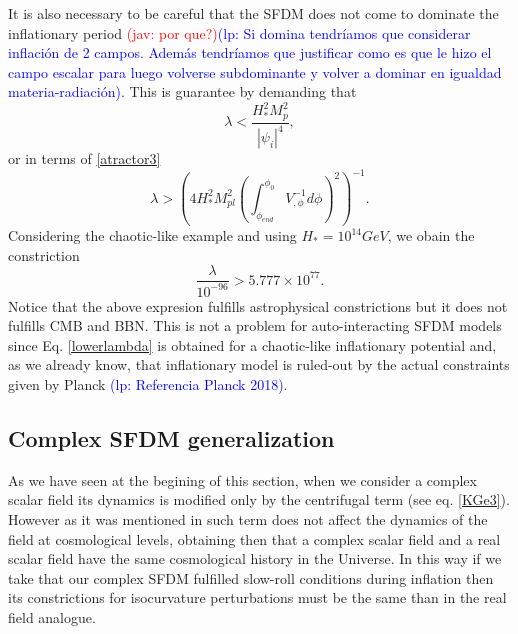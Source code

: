 \documentclass[amssymb,twocolumn,prd,nofootinbib,showpacs]{revtex4-1}
\newcommand{\jav}[1]{\textcolor{red}{(jav: #1)}}
\newcommand{\lp}[1]{\textcolor{blue}{(lp: #1)}}
\begin{document}
It is also necessary to be careful that the SFDM does not come to dominate the inflationary period \jav{por que?}\lp{Si domina tendr\'iamos que considerar inflaci\'on
de 2 campos.  Adem\'as tendr\'iamos que justificar como es
que le hizo el campo escalar para luego volverse subdominante y volver a dominar en igualdad materia-radiaci\'on}.  
This is guarantee by demanding that
%
\begin{equation}
\lambda < \frac{H_*^2 M_p^2}{|\psi_i|^4},
\end{equation}
%
or in terms of \eqref{atractor3}
%
\begin{equation}
\lambda>\left(4H_*^2M_{pl}^2\left(\int_{\phi_{end}}^{\phi_0}V_{,\phi}^{-1}d\phi\right)^2\right)^{-1}.
\end{equation}
%
Considering the chaotic-like example and using $H_*= 10^{14} GeV$, we obain the constriction
\begin{equation}\label{lowerlambda}
\frac{\lambda}{10^{-96}} > 5.777\times 10^{77}.
\end{equation}
Notice that the above expresion fulfills astrophysical constrictions but it does not fulfills CMB and BBN. This is not a problem for auto-interacting SFDM models since Eq. \eqref{lowerlambda} is obtained for a 
chaotic-like inflationary potential and, as we already know, that inflationary model is ruled-out by 
the actual constraints given by Planck \lp{Referencia Planck 2018}.



\subsection{Complex SFDM generalization}
As we have seen at the begining of this section, when we consider a complex scalar field its dynamics is modified 
only by the centrifugal term (see eq. \eqref{KGe3}). However as it was mentioned in \cite{SFphi42} 
such term does not affect the dynamics of the field at cosmological levels, obtaining then that a 
complex scalar field and a real scalar field have the same cosmological history in the Universe. 
%
In this way if we take that our complex SFDM fulfilled slow-roll conditions during inflation then its 
constrictions for isocurvature perturbations must be the same than in the real field analogue. \\
\end{document}
